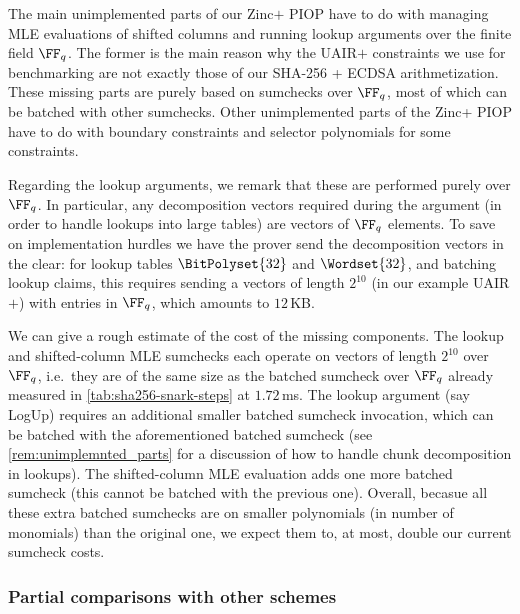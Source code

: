 \begin{remark}\label{rem:unimplemnted_parts} The main unimplemented parts of our Zinc$+$ PIOP have to do with managing MLE evaluations of shifted columns  and running lookup arguments over the finite field $\FF_q$. The former is the main reason why the UAIR$+$ constraints we use for benchmarking are not exactly those of our SHA-256 + ECDSA arithmetization. These missing parts are purely based on sumchecks over $\FF_q$,  most of which can be batched with other sumchecks.  Other unimplemented parts of the Zinc+ PIOP have to do with boundary constraints and selector polynomials for some constraints.

  Regarding the lookup arguments, we remark that these are performed purely over $\FF_q$. In particular, any decomposition vectors required during the argument (in order to handle lookups into large tables) are vectors of $\FF_q$ elements. To save on implementation hurdles we have the prover send the decomposition vectors in the clear: for lookup tables $\BitPolyset{32}$ and $\Wordset{32}$, and batching lookup claims, this requires sending a vectors of length $2^{10}$ (in our example UAIR$+$) with entries in $\FF_q$, which amounts to $12$\,KB.

  We can give a rough estimate of the cost of the missing components. The lookup and shifted-column MLE sumchecks each operate on vectors of length $2^{10}$ over $\FF_q$, i.e.\ they are of the same size as the batched sumcheck over $\FF_q$ already measured in \cref{tab:sha256-snark-steps} at $1.72$\,ms. The lookup argument (say LogUp) requires an additional smaller batched sumcheck invocation, which can be batched with the  aforementioned batched sumcheck (see \cref{rem:unimplemnted_parts} for a discussion of how to handle chunk decomposition in lookups). The shifted-column MLE evaluation adds one more batched sumcheck (this cannot be batched with the previous one). Overall, becasue all these extra batched sumchecks are on smaller polynomials (in number of monomials) than the original one, we expect them to, at most, double our current sumcheck costs.  %
\end{remark}

\subsubsection{Partial comparisons with other schemes}

